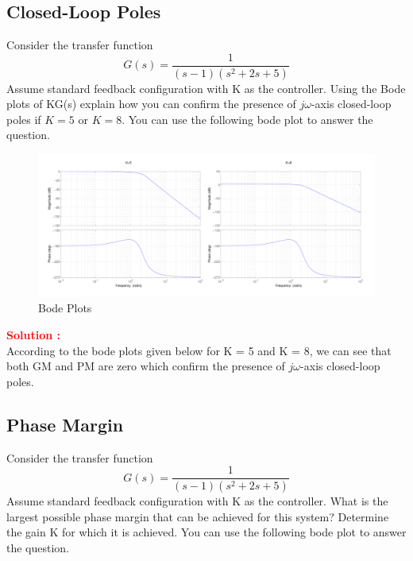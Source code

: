 \documentclass[12pt]{article}
\begin{document}
\subsection{Closed-Loop Poles}  
Consider the transfer function 
\[
G(s)=\frac{1}{(s - 1)(s^2 + 2s + 5)}
\]
Assume standard feedback configuration with K as the controller. Using the Bode plots of KG(s) explain how you can confirm the
presence of $j\omega$-axis closed-loop poles if $K=5$ or $K=8$. You can use the following bode plot to answer the question. \\

\begin{figure}[H]
    \centering
    \includegraphics[width=1\linewidth]{figs/6.14.png}
    \caption{Bode Plots}
    \label{fig:prb30}
\end{figure}


\textbf{\textcolor{red}{Solution :}} \\
According to the bode plots given below for K = 5 and K = 8, we can see that both GM and PM are zero which confirm the presence of $j\omega$-axis closed-loop poles.
\clearpage

\subsection{Phase Margin}

Consider the transfer function 
\[
G(s)=\frac{1}{(s - 1)(s^2 + 2s + 5)}
\]
Assume standard feedback configuration with K as the controller. What is the largest possible phase margin that can be achieved for this system? Determine the gain K for which it is achieved. You can use the following bode plot to answer the question.\\
\end{document}
